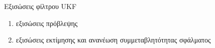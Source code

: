 \documentclass[10pt]{article}
\begin{document}
Εξισώσεις φίλτρου \textlatin{UKF}
\begin{enumerate}
	\item εξισώσεις πρόβλεψης
	\item εξισώσεις εκτίμησης και ανανέωση συμμεταβλητότητας σφάλματος
\end{enumerate}










\nocite{*}
\printbibliography[heading=bibintoc,title={Βιβλιογραφία}]

\end{document}
